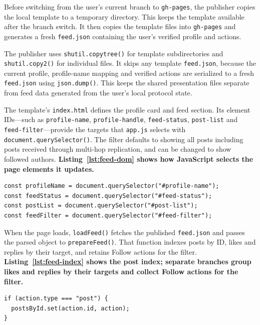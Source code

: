 Before switching from the user's current branch to \texttt{gh-pages}, the
publisher copies the local template to a temporary directory. This keeps the
template available after the branch switch. It then copies the template
files into \texttt{gh-pages} and generates a fresh \texttt{feed.json}
containing the user's verified profile and actions.

The publisher uses \texttt{shutil.copytree()} for template subdirectories and
\texttt{shutil.copy2()} for individual files. It skips any template
\texttt{feed.json}, because the current profile, profile-name mapping and
verified actions are serialized to a fresh \texttt{feed.json} using
\texttt{json.dump()}. This keeps the shared presentation files separate
from feed data generated from the user's local protocol state.

The template's \texttt{index.html} defines the profile card and feed
section. Its element IDs—such as \texttt{profile-name},
\texttt{profile-handle}, \texttt{feed-status}, \texttt{post-list} and
\texttt{feed-filter}—provide the targets that \texttt{app.js} selects with
\texttt{document.querySelector()}. The filter defaults to showing all posts
including posts received through multi-hop replication, and can be changed
to show followed authors. \textbf{Listing~\ref{lst:feed-dom} shows how
JavaScript selects the page elements it updates.}

\begin{lstlisting}[caption={Connecting feed page elements to app.js},label={lst:feed-dom}]
const profileName = document.querySelector("#profile-name");
const feedStatus = document.querySelector("#feed-status");
const postList = document.querySelector("#post-list");
const feedFilter = document.querySelector("#feed-filter");
\end{lstlisting}

When the page loads, \texttt{loadFeed()} fetches the published
\texttt{feed.json} and passes the parsed object to \texttt{prepareFeed()}.
That function indexes posts by ID, likes and replies by their target, and
retains Follow actions for the filter. \textbf{Listing~\ref{lst:feed-index}
shows the post index; separate branches group likes and replies by their
targets and collect Follow actions for the filter.}

\begin{lstlisting}[caption={Indexing action types for feed rendering},label={lst:feed-index}]
if (action.type === "post") {
  postsById.set(action.id, action);
}
\end{lstlisting}

